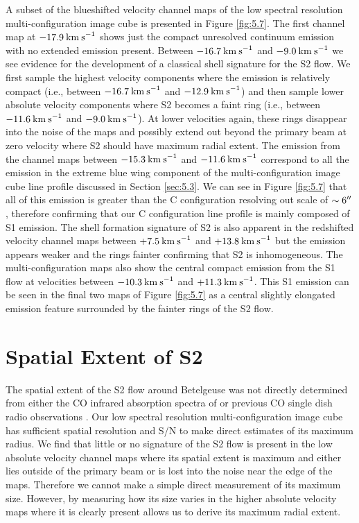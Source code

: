 A subset of the blueshifted velocity channel maps of the low spectral resolution multi-configuration image cube is presented in Figure \ref{fig:5.7}. The first channel map at $-17.9\>{\rm km\>s}^{-1}$ shows just the compact unresolved continuum emission with no extended emission present. Between $-16.7\>{\rm km\>s}^{-1}$ and $-9.0\>{\rm km\>s}^{-1}$ we see evidence for the development of a classical shell signature for the S2 flow. We first sample the highest velocity components where the emission is relatively compact (i.e., between $-16.7\>{\rm km\>s}^{-1}$ and $-12.9\>{\rm km\>s}^{-1}$) and then sample lower absolute velocity components where S2 becomes a faint ring (i.e., between $-11.6\>{\rm km\>s}^{-1}$ and $-9.0\>{\rm km\>s}^{-1}$). At lower velocities again, these rings disappear into the noise of the maps and possibly extend out beyond the primary beam at zero velocity where S2 should have maximum radial extent. The emission from the channel maps between $-15.3\>{\rm km\>s}^{-1}$ and $-11.6\>{\rm km\>s}^{-1}$ correspond to all the emission in the extreme blue wing component of the multi-configuration image cube line profile discussed in Section \ref{sec:5.3}. We can see in Figure \ref{fig:5.7} that all of this emission is greater than the C configuration resolving out scale of $\sim 6^{\prime\prime}$, therefore confirming that our C configuration line profile is mainly composed of S1 emission. The shell formation signature of S2 is also apparent in the redshifted velocity channel maps between $+7.5\>{\rm km\>s}^{-1}$ and $+13.8\>{\rm km\>s}^{-1}$ but the emission appears weaker and the rings fainter confirming that S2 is inhomogeneous. The multi-configuration maps also show the central compact emission from the S1 flow at velocities between $-10.3\>{\rm km\>s}^{-1}$ and $+11.3\>{\rm km\>s}^{-1}$. This S1 emission can be seen in the final two maps of Figure \ref{fig:5.7} as a central slightly elongated emission feature surrounded by the fainter rings of the S2 flow. 

\section{Spatial Extent of S2}\label{sec:5.6}
The spatial extent of the S2 flow around Betelgeuse was not directly determined from either the CO infrared absorption spectra of \cite{bernat_1979} or previous CO single dish radio observations \citep{knapp_1980, huggins_1987, huggins_1994}. Our low spectral resolution multi-configuration image cube has sufficient spatial resolution and S/N to make direct estimates of its maximum radius. We find that little or no signature of the S2 flow is present in the low absolute velocity channel maps where its spatial extent is maximum and either lies outside of the primary beam or is lost into the noise near the edge of the maps. Therefore we cannot make a simple direct measurement of its maximum size. However, by measuring how its size varies in the higher absolute velocity maps where it is clearly present allows us to derive its maximum radial extent. 

